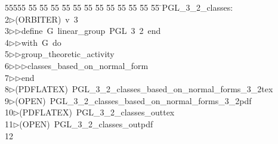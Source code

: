 %
%
\begin{tabbing}
55555 \= 55 \= 55 \= 55 \= 55 \= 55 \= 55 \= 55 \= 55 \= 55 \= 55 \= 55 \= 55 \= \>PGL\_3\_2\_classes:\\[0pt]
2\>$\triangleright$\>(ORBITER)\ v\ 3\ \\[0pt]
3\>$\triangleright$\>$\triangleright$\>define\ G\ linear\_group\ PGL\ 3\ 2\ end\ \\[0pt]
4\>$\triangleright$\>$\triangleright$\>with\ G\ do\ \\[0pt]
5\>$\triangleright$\>$\triangleright$\>group\_theoretic\_activity\ \\[0pt]
6\>$\triangleright$\>$\triangleright$\>$\triangleright$\>classes\_based\_on\_normal\_form\ \\[0pt]
7\>$\triangleright$\>$\triangleright$\>end\\[0pt]
8\>$\triangleright$\>(PDFLATEX)\ PGL\_3\_2\_classes\_based\_on\_normal\_forms\_3\_2tex\\[0pt]
9\>$\triangleright$\>(OPEN)\ PGL\_3\_2\_classes\_based\_on\_normal\_forms\_3\_2pdf\\[0pt]
10\>$\triangleright$\>(PDFLATEX)\ PGL\_3\_2\_classes\_outtex\\[0pt]
11\>$\triangleright$\>(OPEN)\ PGL\_3\_2\_classes\_outpdf\\[0pt]
12\>\end{tabbing}
